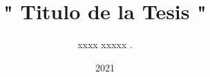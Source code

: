 \documentclass{Tesis_umsa}
\title{" Titulo de la Tesis "}
\author{xxxx xxxxx .}
\date{2021}
\begin{document}
\maketitle



\thesisTables 
\thesisBodyStart









\renewcommand{\appendixname}{ANEXO}
\renewcommand{\appendixtocname}{ANEXO}
\renewcommand{\appendixpagename}{ANEXO}


\end{document}
